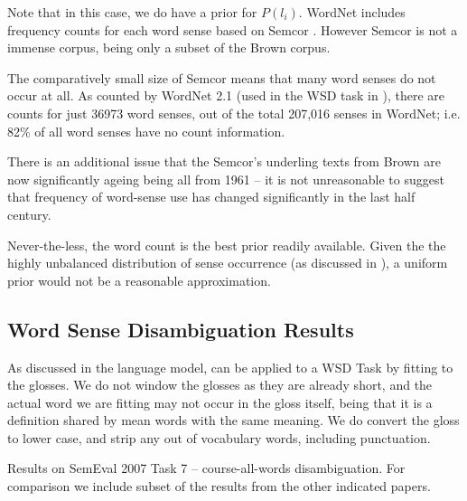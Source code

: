 \documentclass{sig-alternate}
\begin{document}
Note that in this case, we do have a prior for $P(l_i)$.
WordNet includes frequency counts for each word sense based on Semcor \textcite{tengi1998design}.
However Semcor is not a immense corpus, being only a subset of the Brown corpus.

The comparatively small size of Semcor means that many word senses do not occur at all. As counted by WordNet 2.1 (used in the WSD task in ), there are counts for just  36973 word senses, out of the total 207,016 senses in WordNet; i.e. 82\% of all word senses have no count information.

There is an additional issue that the Semcor's underling texts from Brown are now significantly ageing being all from 1961 \cite{francis1979brown} -- it is not unreasonable to suggest that frequency of word-sense use has changed significantly in the last half century.

Never-the-less, the word count is the best prior readily available. Given the the highly unbalanced distribution of sense occurrence (as discussed in ),
a uniform prior would not be a reasonable approximation.




\subsection{Word Sense Disambiguation Results}

As discussed in  the language model, can be applied to a WSD Task by fitting to the glosses. We do not window the glosses as they are already short, and the actual word we are fitting may not occur in the gloss itself, being that it is a definition shared by mean words with the same meaning. We do convert the gloss to lower case, and strip any out of vocabulary words, including punctuation.

\begin{table*}
	\begin{adjustbox}{max width=\textwidth}
	\end{adjustbox}

	\caption{Results on SemEval 2007 Task 7 -- course-all-words disambiguation.
		For comparison we include subset of the results from the other indicated papers.
	} \label{samevalres}
\end{table*}
\end{document}
